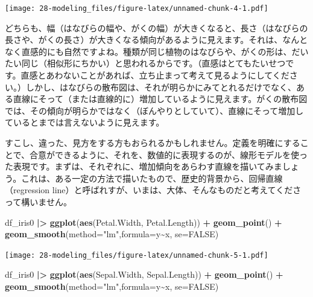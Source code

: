 \documentclass[
  xelatex, ja=standard]{bxjsbook}
\newenvironment{Shaded}{\begin{snugshade}}{\end{snugshade}}
\newcommand{\AttributeTok}[1]{\textcolor[rgb]{0.13,0.29,0.53}{#1}}
\newcommand{\ConstantTok}[1]{\textcolor[rgb]{0.56,0.35,0.01}{#1}}
\newcommand{\FunctionTok}[1]{\textcolor[rgb]{0.13,0.29,0.53}{\textbf{#1}}}
\newcommand{\NormalTok}[1]{#1}
\newcommand{\SpecialCharTok}[1]{\textcolor[rgb]{0.81,0.36,0.00}{\textbf{#1}}}
\newcommand{\StringTok}[1]{\textcolor[rgb]{0.31,0.60,0.02}{#1}}
\theoremstyle{definition}
\theoremstyle{definition}
\theoremstyle{definition}
\theoremstyle{definition}
\theoremstyle{remark}
\begin{document}
\texttt{[image: 28-modeling\_files/figure-latex/unnamed-chunk-4-1.pdf]}

どちらも、幅（はなびらの幅や、がくの幅）が大きくなると、長さ（はなびらの長さや、がくの長さ）が大きくなる傾向があるように見えます。それは、なんとなく直感的にも自然ですよね。種類が同じ植物のはなびらや、がくの形は、だいたい同じ（相似形にちかい）と思われるからです。（直感はとてもたいせつです。直感とあわないことがあれば、立ち止まって考えて見るようにしてください。）しかし、はなびらの散布図は、それが明らかにみてとれるだけでなく、ある直線にそって（または直線的に）増加しているように見えます。がくの散布図では、その傾向が明らかではなく（ぼんやりとしていて）、直線にそって増加しているとまでは言えないように見えます。

すこし、違った、見方をする方もおられるかもしれません。定義を明確にすることで、合意ができるように、それを、数値的に表現するのが、線形モデルを使った表現です。まずは、それぞれに、増加傾向をあらわす直線を描いてみましょう。これは、ある一定の方法で描いたもので、歴史的背景から、回帰直線（regression line）と呼ばれすが、いまは、大体、そんなものだと考えてくださって構いません。

\begin{Shaded}
\begin{Highlighting}[]
\NormalTok{df\_iris0 }\SpecialCharTok{|\textgreater{}} \FunctionTok{ggplot}\NormalTok{(}\FunctionTok{aes}\NormalTok{(Petal.Width, Petal.Length)) }\SpecialCharTok{+} \FunctionTok{geom\_point}\NormalTok{() }\SpecialCharTok{+} \FunctionTok{geom\_smooth}\NormalTok{(}\AttributeTok{method=}\StringTok{"lm"}\NormalTok{,}\AttributeTok{formula=}\NormalTok{y}\SpecialCharTok{\textasciitilde{}}\NormalTok{x, }\AttributeTok{se=}\ConstantTok{FALSE}\NormalTok{)}
\end{Highlighting}
\end{Shaded}

\texttt{[image: 28-modeling\_files/figure-latex/unnamed-chunk-5-1.pdf]}

\begin{Shaded}
\begin{Highlighting}[]
\NormalTok{df\_iris0 }\SpecialCharTok{|\textgreater{}} \FunctionTok{ggplot}\NormalTok{(}\FunctionTok{aes}\NormalTok{(Sepal.Width, Sepal.Length)) }\SpecialCharTok{+} \FunctionTok{geom\_point}\NormalTok{() }\SpecialCharTok{+} \FunctionTok{geom\_smooth}\NormalTok{(}\AttributeTok{method=}\StringTok{"lm"}\NormalTok{,}\AttributeTok{formula=}\NormalTok{y}\SpecialCharTok{\textasciitilde{}}\NormalTok{x, }\AttributeTok{se=}\ConstantTok{FALSE}\NormalTok{)}
\end{Highlighting}
\end{Shaded}
\end{document}
